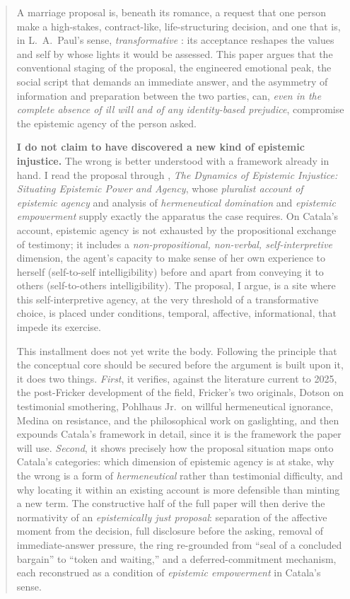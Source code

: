 \documentclass[11pt,a4paper]{article}
\begin{document}
\begin{abstract}
\noindent
A marriage proposal is, beneath its romance, a request that one person make a high-stakes, contract-like, life-structuring decision, and one that is, in L.~A.\ Paul's sense, \emph{transformative} \parencite{paul2014transformative}: its acceptance reshapes the values and self by whose lights it would be assessed. This paper argues that the conventional staging of the proposal, the engineered emotional peak, the social script that demands an immediate answer, and the asymmetry of information and preparation between the two parties, can, \emph{even in the complete absence of ill will and of any identity-based prejudice}, compromise the epistemic agency of the person asked.

\smallskip
\noindent \textbf{I do not claim to have discovered a new kind of epistemic injustice.} The wrong is better understood with a framework already in hand. I read the proposal through \textcite{catala2025dynamics}, \emph{The Dynamics of Epistemic Injustice: Situating Epistemic Power and Agency}, whose \emph{pluralist account of epistemic agency} and analysis of \emph{hermeneutical domination} and \emph{epistemic empowerment} supply exactly the apparatus the case requires. On Catala's account, epistemic agency is not exhausted by the propositional exchange of testimony; it includes a \emph{non-propositional, non-verbal, self-interpretive} dimension, the agent's capacity to make sense of her own experience to herself (self-to-self intelligibility) before and apart from conveying it to others (self-to-others intelligibility). The proposal, I argue, is a site where this self-interpretive agency, at the very threshold of a transformative choice, is placed under conditions, temporal, affective, informational, that impede its exercise.

\smallskip
\noindent This installment does not yet write the body. Following the principle that the conceptual core should be secured before the argument is built upon it, it does two things. \emph{First}, it verifies, against the literature current to 2025, the post-Fricker development of the field, Fricker's two originals, Dotson on testimonial smothering, Pohlhaus Jr.\ on willful hermeneutical ignorance, Medina on resistance, and the philosophical work on gaslighting, and then expounds Catala's framework in detail, since it is the framework the paper will use. \emph{Second}, it shows precisely how the proposal situation maps onto Catala's categories: which dimension of epistemic agency is at stake, why the wrong is a form of \emph{hermeneutical} rather than testimonial difficulty, and why locating it within an existing account is more defensible than minting a new term. The constructive half of the full paper will then derive the normativity of an \emph{epistemically just proposal}: separation of the affective moment from the decision, full disclosure before the asking, removal of immediate-answer pressure, the ring re-grounded from ``seal of a concluded bargain'' to ``token and waiting,'' and a deferred-commitment mechanism, each reconstrued as a condition of \emph{epistemic empowerment} in Catala's sense.


\end{abstract}
\end{document}
